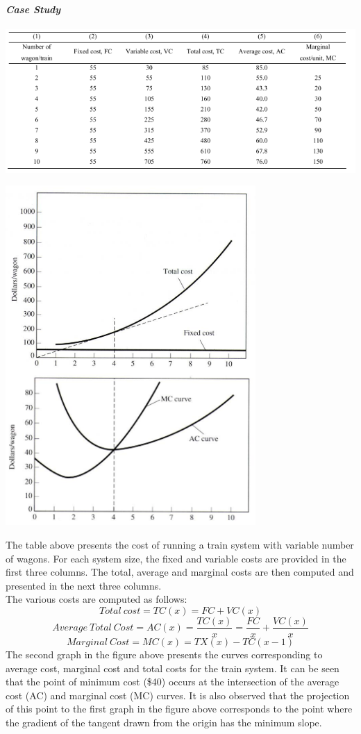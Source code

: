 \paragraph{\textit{Case Study}}
\begin{center}
	\includegraphics[scale=0.7]{gfx/fig50.png}
\end{center}
\begin{center}
	\includegraphics[scale=0.7]{gfx/fig51.png}
\end{center}
The table above presents the cost of running a train system with variable number of wagons. For each system size, the fixed and variable costs are provided in the first three columns. The total, average and marginal costs are then computed and presented in the next three columns.\\
The various costs are computed as follows:
$$ Total \: cost = TC(x) = FC + VC(x)$$
$$ Average \: Total \: Cost = AC(x) =  \frac{TC(x)}{x} = \frac{FC}{x} + \frac{VC(x)}{x}$$
$$Marginal \: Cost = MC(x) = TX(x) - TC(x-1)$$
The second graph in the figure above presents the curves corresponding to average cost, marginal cost and total costs for the train system. It can be seen that the point of minimum cost (\$40) occurs at the intersection of the average cost (AC) and marginal cost (MC) curves. It is also observed that the projection of this point to the first graph in the figure above corresponds to the point where the gradient of the tangent drawn from the origin has the minimum slope.
